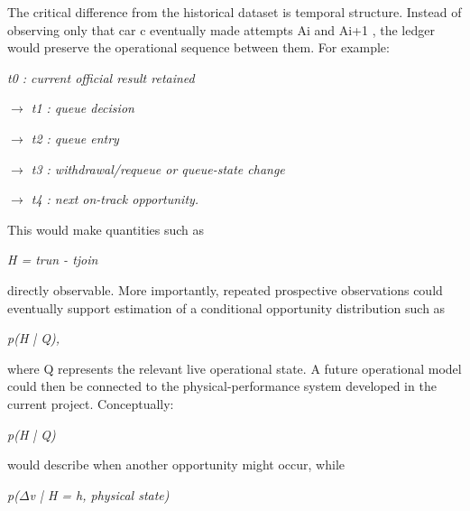 The critical difference from the historical dataset is temporal structure. Instead of observing only that car c eventually made attempts Ai and Ai+1 , the ledger would preserve the operational sequence between them. For example:

\begin{center}\textit{t0 : current official result retained}\end{center}

\begin{center}\textit{\ensuremath{\rightarrow} t1 : queue decision}\end{center}

\begin{center}\textit{\ensuremath{\rightarrow} t2 : queue entry}\end{center}

\begin{center}\textit{\ensuremath{\rightarrow} t3 : withdrawal/requeue or queue-state change}\end{center}

\begin{center}\textit{\ensuremath{\rightarrow} t4 : next on-track opportunity.}\end{center}

This would make quantities such as

\begin{center}\textit{H = trun - tjoin}\end{center}

directly observable. More importantly, repeated prospective observations could eventually support estimation of a conditional opportunity distribution such as

\begin{center}\textit{p(H | Q),}\end{center}

where Q represents the relevant live operational state. A future operational model could then be connected to the physical-performance system developed in the current project. Conceptually:

\begin{center}\textit{p(H | Q)}\end{center}

would describe when another opportunity might occur, while

\begin{center}\textit{p(\ensuremath{\Delta}v | H = h, physical state)}\end{center}

